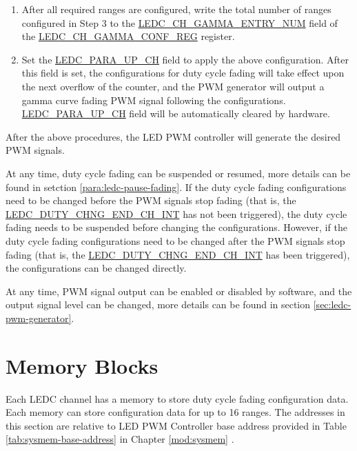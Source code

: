 \documentclass[main\_\_EN.tex]{subfiles}
\begin{document}
\begin{enumerate}
\begin{enumerate}
\begin{enumerate}
\begin{enumerate}
            \end{enumerate}
            \item After all required ranges are configured, write the total number of ranges configured in Step 3 to the \hyperref[fielddesc:LEDCCHNGAMMAENTRYNUM]{LEDC\_CH\_GAMMA\_ENTRY\_NUM} field of the \hyperref[regdesc:LEDCCHNGAMMACONFREG]{LEDC\_CH\_GAMMA\_CONF\_REG} register.
            \item Set the \hyperref[fielddesc:LEDCPARAUPCHN]{LEDC\_PARA\_UP\_CH} field to apply the above configuration. After this field is set, the configurations for duty cycle fading will take effect upon the next overflow of the counter, and the PWM generator will output a gamma curve fading PWM signal following the configurations. \hyperref[fielddesc:LEDCPARAUPCHN]{LEDC\_PARA\_UP\_CH} field will be automatically cleared by hardware.
        \end{enumerate}
    \end{enumerate}
\end{enumerate}

After the above procedures, the LED PWM controller will generate the desired PWM signals.

At any time, duty cycle fading can be suspended or resumed, more details can be found in setction \ref{para:ledc-pause-fading}. If the duty cycle fading configurations need to be changed before the PWM signals stop fading (that is, the \hyperref[int:ledc-duty-chng-end]{LEDC\_DUTY\_CHNG\_END\_CH\_INT} has not been triggered), the duty cycle fading needs to be suspended before changing the configurations. However, if the duty cycle fading configurations need to be changed after the PWM signals stop fading (that is, the \hyperref[int:ledc-duty-chng-end]{LEDC\_DUTY\_CHNG\_END\_CH\_INT} has been triggered), the configurations can be changed directly.

At any time, PWM signal output can be enabled or disabled by software, and the output signal level can be changed, more details can be found in section \ref{sec:ledc-pwm-generator}.


\section{Memory Blocks}

Each LEDC channel has a memory to store duty cycle fading configuration data. Each memory can store configuration data for up to 16 ranges. The addresses in this section are relative to LED PWM Controller base address provided in Table \ref{tab:sysmem-base-address} in Chapter \ref{mod:sysmem} \textit{}.
\end{document}
